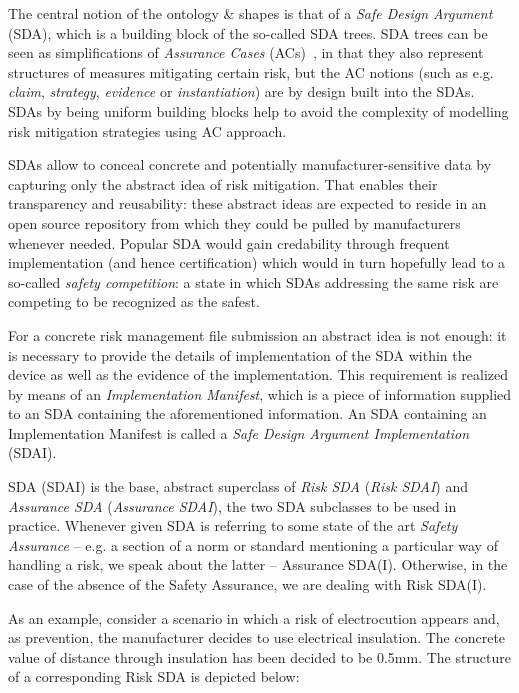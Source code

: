 

The central notion of the \riskman ontology \& shapes is that of a \emph{Safe Design Argument} (SDA), which is a building block of the so-called SDA trees. SDA trees can be seen as simplifications of \emph{Assurance Cases} (ACs)~\cite{WeinstockG09}, in that they also represent structures of measures mitigating certain risk, but the AC notions (such as e.g. \emph{claim}, \emph{strategy}, \emph{evidence} or \emph{instantiation}) are by design built into the SDAs. SDAs by being uniform building blocks help to avoid the complexity of modelling risk mitigation strategies using AC approach.

SDAs allow to conceal concrete and potentially manufacturer-sensitive data by capturing only the abstract idea of risk mitigation. That enables their transparency and reusability: these abstract ideas are expected to reside in an open source repository from which they could be pulled by manufacturers whenever needed. Popular SDA would gain credability through frequent implementation (and hence certification) which would in turn hopefully lead to a so-called \emph{safety competition}: a state in which SDAs addressing the same risk are competing to be recognized as the safest.

For a concrete risk management file submission an abstract idea is not enough: it is necessary to provide the details of implementation of the SDA within the device as well as the evidence of the implementation. This requirement is realized by means of an \emph{Implementation Manifest}, which is a piece of information supplied to an SDA containing the aforementioned information. An SDA containing an Implementation Manifest is called a \emph{Safe Design Argument Implementation} (SDAI).

SDA (SDAI) is the base, abstract superclass of \emph{Risk SDA} (\emph{Risk SDAI}) and \emph{Assurance SDA} (\emph{Assurance SDAI}), the two SDA subclasses to be used in practice. Whenever given SDA is referring to some state of the art \emph{Safety Assurance} -- e.g. a section of a norm or standard mentioning a particular way of handling a risk, we speak about the latter -- Assurance SDA(I). Otherwise, in the case of the absence of the Safety Assurance, we are dealing with Risk SDA(I).

As an example, consider a scenario in which a risk of electrocution appears and, as prevention, the manufacturer decides to use electrical insulation. The concrete value of distance through insulation has been decided to be 0.5mm.
The structure of a corresponding Risk SDA is depicted below:


